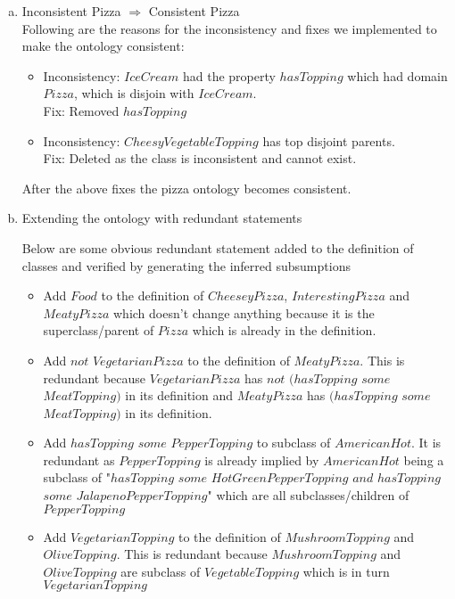 \documentclass{article}
\begin{document}
\begin{enumerate}[(a)]
\begin{itemize}
\end{itemize}

\item Inconsistent Pizza $\Rightarrow$ Consistent Pizza\\

Following are the reasons for the inconsistency and fixes we implemented to make the ontology consistent: \\

\begin{itemize}
\item Inconsistency: $IceCream$ had the property $hasTopping$ which had domain $Pizza$, which is disjoin with $IceCream$. \\
Fix: Removed $hasTopping$
\item Inconsistency: $CheesyVegetableTopping$ has top disjoint parents. \\
Fix: Deleted as the class is inconsistent and cannot exist.
\end{itemize}

After the above fixes the pizza ontology becomes consistent.

\item Extending the ontology with redundant statements

Below are some obvious redundant statement added to the definition of classes and verified by generating the inferred subsumptions
\begin{itemize}
\item Add $Food$ to the definition of $CheeseyPizza$, $InterestingPizza$ and $MeatyPizza$ which doesn’t change anything because it is the superclass/parent of $Pizza$ which is already in the definition.

\item Add $not$ $VegetarianPizza$ to the definition of $MeatyPizza$. This is redundant because $VegetarianPizza$ has $not$ $(hasTopping$ $some$ $MeatTopping)$ in its definition and $MeatyPizza$ has $(hasTopping$ $some$ $MeatTopping)$ in its definition.

\item Add $hasTopping$ $some$ $PepperTopping$ to subclass of $AmericanHot$. It is redundant as $PepperTopping$ is already implied by $AmericanHot$ being a subclass of "$hasTopping$ $some$ $HotGreenPepperTopping$ $and$ $hasTopping$ $some$ $JalapenoPepperTopping$" which are all subclasses/children of $PepperTopping$

\item Add $VegetarianTopping$ to the definition of $MushroomTopping$ and $OliveTopping$. This is redundant because $MushroomTopping$ and $OliveTopping$ are subclass of $VegetableTopping$ which is in turn $VegetarianTopping$

\end{itemize}











\end{enumerate}
\end{document}
